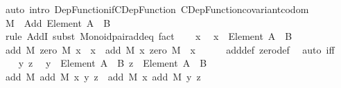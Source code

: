 \begin{isabellebody}
\ {\isacharparenleft}{\kern0pt}auto\ intro{\isacharcolon}{\kern0pt}\ Dep{\isacharunderscore}{\kern0pt}Function{\isacharunderscore}{\kern0pt}if{\isacharunderscore}{\kern0pt}CDep{\isacharunderscore}{\kern0pt}Function\ CDep{\isacharunderscore}{\kern0pt}Function{\isacharunderscore}{\kern0pt}covariant{\isacharunderscore}{\kern0pt}codom{\isacharparenright}{\kern0pt}\isanewline
\ \ \isamarkupfalse%
\ {\isachardoublequoteopen}{\isacharquery}{\kern0pt}M\ {\isacharcolon}{\kern0pt}\ Add\ {\isacharparenleft}{\kern0pt}Element\ {\isacharparenleft}{\kern0pt}A\ {\isasymtimes}\ B{\isacharparenright}{\kern0pt}{\isacharparenright}{\kern0pt}{\isachardoublequoteclose}\isanewline
\ \ \ \ \isanewline
\ \ \ \ \isanewline
\ \ \ \ \isamarkupfalse%
\ {\isacharparenleft}{\kern0pt}rule\ AddI{\isacharcomma}{\kern0pt}\ subst\ Monoid{\isacharunderscore}{\kern0pt}pair{\isacharunderscore}{\kern0pt}add{\isacharunderscore}{\kern0pt}eq{\isacharparenright}{\kern0pt}\ fact\isanewline
\isanewline
\ \ \isamarkupfalse%
\ x\ \isamarkupfalse%
\ {\isachardoublequoteopen}x\ {\isacharcolon}{\kern0pt}\ Element\ {\isacharparenleft}{\kern0pt}A\ {\isasymtimes}\ B{\isacharparenright}{\kern0pt}{\isachardoublequoteclose}\isanewline
\ \ \isamarkupfalse%
\ \isamarkupfalse%
\ {\isachardoublequoteopen}add\ {\isacharquery}{\kern0pt}M\ {\isacharparenleft}{\kern0pt}zero\ {\isacharquery}{\kern0pt}M{\isacharparenright}{\kern0pt}\ x\ {\isacharequal}{\kern0pt}\ x{\isachardoublequoteclose}\ \ {\isachardoublequoteopen}add\ {\isacharquery}{\kern0pt}M\ x\ {\isacharparenleft}{\kern0pt}zero\ {\isacharquery}{\kern0pt}M{\isacharparenright}{\kern0pt}\ {\isacharequal}{\kern0pt}\ x{\isachardoublequoteclose}\isanewline
\ \ \ \ \isamarkupfalse%
\ add{\isacharunderscore}{\kern0pt}def\ zero{\isacharunderscore}{\kern0pt}def\ \isamarkupfalse%
\ {\isacharparenleft}{\kern0pt}auto\ iff{\isacharcolon}{\kern0pt}\ {}{\isacharparenright}{\kern0pt}\isanewline
\isanewline
\ \ \isamarkupfalse%
\ y\ z\ \isamarkupfalse%
\ {\isachardoublequoteopen}y\ {\isacharcolon}{\kern0pt}\ Element\ {\isacharparenleft}{\kern0pt}A\ {\isasymtimes}\ B{\isacharparenright}{\kern0pt}{\isachardoublequoteclose}\ {\isachardoublequoteopen}z\ {\isacharcolon}{\kern0pt}\ Element\ {\isacharparenleft}{\kern0pt}A\ {\isasymtimes}\ B{\isacharparenright}{\kern0pt}{\isachardoublequoteclose}\isanewline
\ \ \isamarkupfalse%
\ \isamarkupfalse%
\ {\isachardoublequoteopen}add\ {\isacharquery}{\kern0pt}M\ {\isacharparenleft}{\kern0pt}add\ {\isacharquery}{\kern0pt}M\ x\ y{\isacharparenright}{\kern0pt}\ z\ {\isacharequal}{\kern0pt}\ add\ {\isacharquery}{\kern0pt}M\ x\ {\isacharparenleft}{\kern0pt}add\ {\isacharquery}{\kern0pt}M\ y\ z{\isacharparenright}{\kern0pt}{\isachardoublequoteclose}\isanewline

\end{isabellebody}
